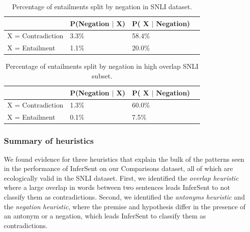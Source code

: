 \begin{table}[htb]
 \centering
  \begin{tabular}{llll}
  \toprule
    & P(Negation $|$ X) & P( X $|$ Negation) \\
    \midrule
    X = Contradiction & 3.3\%  & 58.4\%  \\
      X = Entailment &  1.1\%  &  20.0\%  \\
\bottomrule
  \end{tabular}
 \caption{Percentage of entailments split by negation in SNLI dataset.}
  \label{tab:negation}
\end{table}
%

\begin{table}[htb]
  \centering
  \begin{tabular}{llll}
  \toprule
    & P(Negation $|$ X) & P( X $|$ Negation) \\
    \midrule
    X = Contradiction & 1.3\% & 60.0\% \\
      X = Entailment &  0.1\% &  7.5\% \\
\bottomrule 
  \end{tabular}
 \caption{Percentage of entailments split by negation in high overlap SNLI subset.}
  \label{tab:negation-ho}
\end{table}


\subsubsection{Summary of heuristics}

We found evidence for three heuristics that explain the bulk of the patterns seen in the performance of InferSent on our Comparisons dataset, all of which are ecologically valid in the SNLI dataset. First, we identified the \textit{overlap heuristic} where a large overlap in words between two sentences leads InferSent to not classify them as contradictions. Second, we identified the \textit{antonyms heuristic} and the \textit{negation heuristic}, where the premise and hypothesis differ in the presence of an antonym or a negation, which leads InferSent to classify them as contradictions. 

